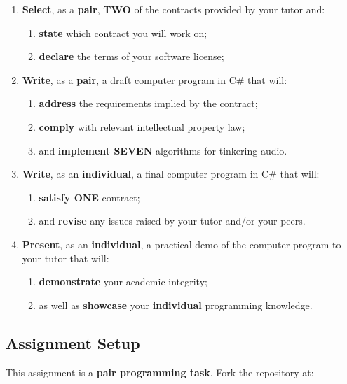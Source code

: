\documentclass{../../fal_assignment}
\begin{document}
\begin{enumerate}[label=(\Alph*)]
    \item \textbf{Select}, as a \textbf{pair}, \textbf{TWO} of the contracts provided by your tutor and:
    	\begin{enumerate}[label=\roman*.]
    		\item \textbf{state} which contract you will work on;
     		\item \textbf{declare} the terms of your software license;
	\end{enumerate}
    \item \textbf{Write}, as a \textbf{pair}, a draft computer program in C\# that will:
    	\begin{enumerate}[label=\roman*.]
    		\item \textbf{address} the requirements implied by the contract;
    		\item \textbf{comply} with relevant intellectual property law;
    		\item and \textbf{implement SEVEN} algorithms for tinkering audio.
	\end{enumerate}
    \item \textbf{Write}, as an \textbf{individual}, a final computer program in C\# that will:
    	\begin{enumerate}[label=\roman*.]
    		\item \textbf{satisfy ONE} contract;
    		\item and \textbf{revise} any issues raised by your tutor and/or your peers.
	\end{enumerate}
    \item \textbf{Present}, as an \textbf{individual}, a practical demo of the computer program to your tutor that will:
    	\begin{enumerate}[label=\roman*.]
    		\item \textbf{demonstrate} your academic integrity;
    		\item as well as \textbf{showcase} your \textbf{individual} programming knowledge.
	\end{enumerate}
\end{enumerate}

\subsection*{Assignment Setup}

This assignment is a \textbf{pair programming task}. Fork the repository at:
\end{document}

